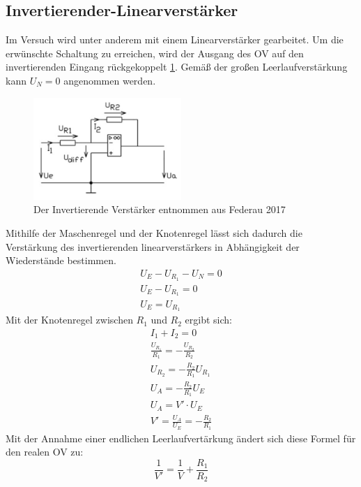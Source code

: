     \subsection{Invertierender-Linearverstärker}
        Im Versuch wird unter anderem mit einem Linearverstärker gearbeitet.
        Um die erwünschte Schaltung zu erreichen, wird der Ausgang des OV auf den invertierenden Eingang rückgekoppelt \ref{fig:inv_Ver}.
        Gemäß der großen Leerlaufverstärkung kann $U_N = 0$ angenommen werden.
        \begin{figure}[ht]
            \centering
            \includegraphics[width = 0.5\textwidth]{bilder/invertierender_verstaerker.png}
            \caption{Der Invertierende Verstärker entnommen aus Federau 2017}
            \label{fig:inv_Ver}
        \end{figure}
        Mithilfe der Maschenregel und der Knotenregel lässt sich dadurch die Verstärkung des invertierenden linearverstärkers in Abhängigkeit der Wiederstände bestimmen.
        \begin{align*}
            U_E -U_{R_1}-U_N = 0\\
            U_E -U_{R_1} = 0\\
            U_E = U_{R_1}
        \end{align*}
        Mit der Knotenregel zwischen $R_1$ und $R_2$ ergibt sich:
        \begin{align*}
            I_1+I_2 = 0\\
            \frac{U_{R_1}}{R_1} = -\frac{U_{R_2}}{R_2}\\
            U_{R_2} = -\frac{R_2}{R_1} U_{R_1}\\
            U_{A} = -\frac{R_2}{R_1} U_{E}\\
            U_{A} = V' \cdot U_{E}\\
            V' = \frac{U_A}{U_E} = -\frac{R_2}{R_1}
        \end{align*}
        Mit der Annahme einer endlichen Leerlaufvertärkung ändert sich diese Formel für den realen OV zu:
        \begin{equation*}
            \frac{1}{V'}= \frac{1}{V} +\frac{R_1}{R_2}
        \end{equation*}
